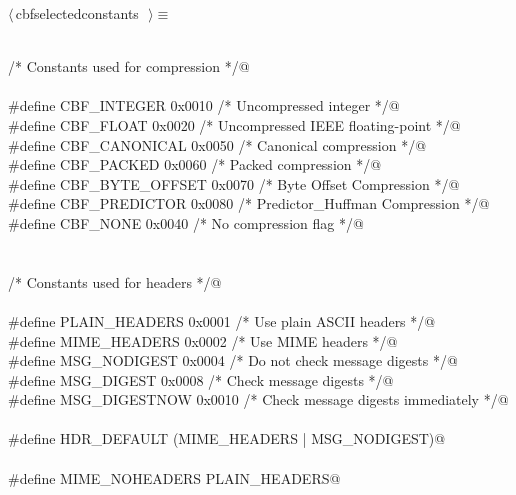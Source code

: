 \documentclass[10pt,a4paper,twoside,notitlepage]{article}
\begin{document}
\begin{flushleft} \small \label{scrap2}
$\langle\,$cbfselectedconstants\nobreak\ {\footnotesize {}}$\,\rangle\equiv$
\vspace{-1ex}
\begin{list}{}{} \item
\mbox{}\verb@@\\
\mbox{}\verb@  /* Constants used for compression */@\\
\mbox{}\verb@@\\
\mbox{}\verb@#define CBF_INTEGER     0x0010  /* Uncompressed integer               */@\\
\mbox{}\verb@#define CBF_FLOAT       0x0020  /* Uncompressed IEEE floating-point   */@\\
\mbox{}\verb@#define CBF_CANONICAL   0x0050  /* Canonical compression              */@\\
\mbox{}\verb@#define CBF_PACKED      0x0060  /* Packed compression                 */@\\
\mbox{}\verb@#define CBF_BYTE_OFFSET 0x0070  /* Byte Offset Compression            */@\\
\mbox{}\verb@#define CBF_PREDICTOR   0x0080  /* Predictor_Huffman Compression      */@\\
\mbox{}\verb@#define CBF_NONE        0x0040  /* No compression flag                */@\\
\mbox{}\verb@@\\
\mbox{}\verb@@\\
\mbox{}\verb@  /* Constants used for headers */@\\
\mbox{}\verb@@\\
\mbox{}\verb@#define PLAIN_HEADERS   0x0001  /* Use plain ASCII headers            */@\\
\mbox{}\verb@#define MIME_HEADERS    0x0002  /* Use MIME headers                   */@\\
\mbox{}\verb@#define MSG_NODIGEST    0x0004  /* Do not check message digests       */@\\
\mbox{}\verb@#define MSG_DIGEST      0x0008  /* Check message digests              */@\\
\mbox{}\verb@#define MSG_DIGESTNOW   0x0010  /* Check message digests immediately  */@\\
\mbox{}\verb@@\\
\mbox{}\verb@#define HDR_DEFAULT (MIME_HEADERS | MSG_NODIGEST)@\\
\mbox{}\verb@@\\
\mbox{}\verb@#define MIME_NOHEADERS  PLAIN_HEADERS@\\

\end{list}
\end{flushleft}
\end{document}

